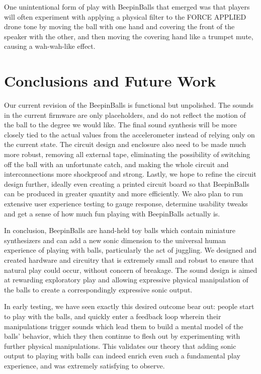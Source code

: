 \documentclass{nime-alternate}
\begin{document}
One unintentional form of play with BeepinBalls that emerged was that 
players will often experiment with applying a physical filter to the FORCE APPLIED drone 
tone by moving the ball with one hand and covering the front of the speaker with the other, 
and then moving the covering hand like a trumpet mute, causing a wah-wah-like effect. 

\section{Conclusions and Future Work}

Our current revision of the BeepinBalls is functional but unpolished. The sounds in the 
current firmware are only placeholders, and do not reflect the motion of the ball to the 
degree we would like. The final sound synthesis will be more closely tied to the actual 
values from the accelerometer instead of relying only on the current state. The circuit
design and enclosure also need to be made much more robust, removing all external tape,
eliminating the possibility of switching off the ball with an unfortunate catch, and
making the whole circuit and interconnections more shockproof and strong. Lastly, we
hope to refine the circuit design further, ideally even creating a printed circuit board
so that BeepinBalls can be produced in greater quantity and more efficiently. We also
plan to run extensive user experience testing to gauge response, determine usability 
tweaks and get a sense of how much fun playing with BeepinBalls actually is.

In conclusion, BeepinBalls are hand-held toy balls which contain miniature synthesizers
and can add a new sonic dimension to the universal human experience of playing with 
balls, particularly the act of juggling. We designed and created hardware and circuitry
that is extremely small and robust to ensure that natural play could occur, without concern of 
breakage. The sound design is aimed at rewarding exploratory play and allowing expressive 
physical manipulation of the balls to create a correspondingly expressive sonic output. 

In early testing, we have seen exactly this desired outcome bear out: people start to play 
with the balls, and quickly enter a feedback loop wherein their manipulations trigger sounds 
which lead them to build a mental model of the balls' behavior, which they then continue to 
flesh out by experimenting with further physical manipulations. This validates our theory that 
adding sonic output to playing with balls can indeed enrich even such a fundamental play experience, and was 
extremely satisfying to observe.
\end{document}
